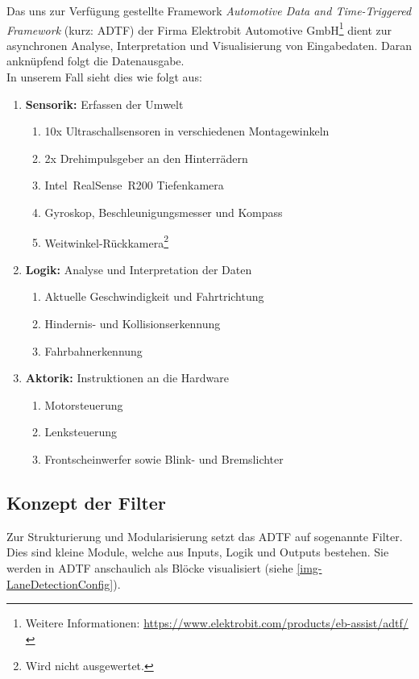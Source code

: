 \documentclass[a4paper,12pt]{report}
\begin{document}
	Das uns zur Verfügung gestellte Framework \emph{Automotive Data and Time-Triggered Framework} (kurz: ADTF) der Firma Elektrobit Automotive GmbH\footnote{Weitere Informationen: \url{https://www.elektrobit.com/products/eb-assist/adtf/}} dient zur asynchronen Analyse, Interpretation und Visualisierung von Eingabedaten.
	Daran anknüpfend folgt die Datenausgabe.
	\\
	In unserem Fall sieht dies wie folgt aus:
	\begin{enumerate}
		\item{\textbf{Sensorik:} Erfassen der Umwelt
			\begin{enumerate}
				\item 10x Ultraschallsensoren in verschiedenen Montagewinkeln
				\item 2x Drehimpulsgeber an den Hinterrädern
				\item Intel\textregistered\ RealSense\texttrademark\ R200 Tiefenkamera
				\item Gyroskop, Beschleunigungsmesser und Kompass
				\item Weitwinkel-Rückkamera\footnote{Wird nicht ausgewertet.}
			\end{enumerate}
		}
		\item{\textbf{Logik:} Analyse und Interpretation der Daten
			\begin{enumerate}
				\item Aktuelle Geschwindigkeit und Fahrtrichtung
				\item Hindernis- und Kollisionserkennung
				\item Fahrbahnerkennung
			\end{enumerate}
		}
		\item{\textbf{Aktorik:} Instruktionen an die Hardware
			\begin{enumerate}
				\item Motorsteuerung
				\item Lenksteuerung
				\item Frontscheinwerfer sowie Blink- und Bremslichter
			\end{enumerate}
		}
	\end{enumerate}

\subsection{Konzept der Filter}

	Zur Strukturierung und Modularisierung setzt das ADTF auf sogenannte Filter.
	Dies sind kleine Module, welche aus Inputs, Logik und Outputs bestehen.
	Sie werden in ADTF anschaulich als Blöcke visualisiert (siehe \autoref{img-LaneDetectionConfig}).
\end{document}

